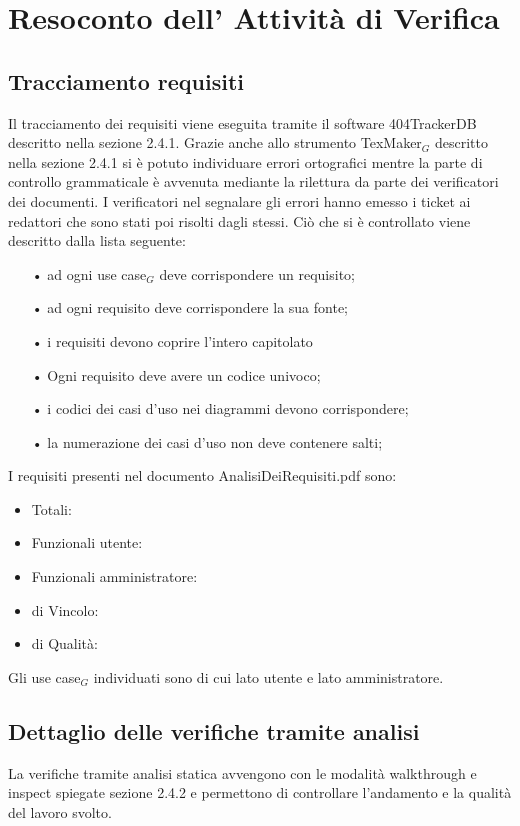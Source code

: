 \section{Resoconto dell' Attività di Verifica}

\subsection{Tracciamento requisiti}
Il tracciamento dei requisiti viene eseguita tramite il software 404TrackerDB descritto nella sezione 2.4.1. 
Grazie anche allo strumento TexMaker$_G$ descritto nella sezione 2.4.1 si è potuto individuare errori ortografici mentre la parte di controllo grammaticale è avvenuta mediante la rilettura da parte dei verificatori dei documenti. I verificatori nel segnalare gli errori hanno emesso i ticket ai redattori che sono stati poi risolti dagli stessi.
Ciò che si è controllato viene descritto dalla lista seguente:
\begin{itemize}
\item[•] ad ogni use case$_G$ deve corrispondere un requisito;
\item[•] ad ogni requisito deve corrispondere la sua fonte;
\item[•] i requisiti devono coprire l'intero capitolato
\item[•] Ogni requisito deve avere un codice univoco;
\item[•] i codici dei casi d'uso nei diagrammi devono corrispondere;
\item[•] la numerazione dei casi d'uso non deve contenere salti;
\end{itemize}
I requisiti presenti nel documento AnalisiDeiRequisiti.pdf sono:
\begin{itemize}
\item Totali: 
\item Funzionali utente:
\item Funzionali amministratore:
\item di Vincolo:
\item di Qualità:
\end{itemize}
Gli use case$_G$ individuati sono di cui lato utente e lato  amministratore.
\subsection{Dettaglio delle verifiche tramite analisi}
La verifiche tramite analisi statica avvengono con le modalità walkthrough e inspect spiegate sezione 2.4.2 e permettono di controllare l'andamento e la qualità del lavoro svolto.
